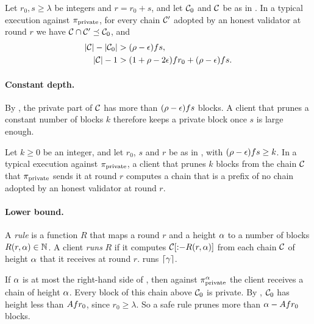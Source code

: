 \begin{lemma}\label{lem.attack}
    Let $r_0,s\ge\lambda$ be integers and $r=r_0+s$, and let $\mathcal{C}_0$ and $\mathcal{C}$
    be as in . In a typical execution against $\pi_{\mathrm{private}}$, for
    every chain $\mathcal{C}'$ adopted by an honest validator at round $r$ we have
    $\mathcal{C}\cap\mathcal{C}'\preceq\mathcal{C}_0$, and
    \begin{align}
        \lvert \mathcal{C}\rvert-\lvert \mathcal{C}_0\rvert &> (\rho-\epsilon)fs,
            \label{eq.attfork}\\
        \lvert \mathcal{C}\rvert-1 &> (1+\rho-2\epsilon)fr_0+(\rho-\epsilon)fs.
            \label{eq.attheight}
    \end{align}
\end{lemma}

\paragraph{Constant depth.}

By , the private part of $\mathcal{C}$ has more than
$(\rho-\epsilon)fs$ blocks. A client that prunes a constant number of
blocks $k$ therefore keeps a private block once $s$ is large enough.

\begin{corollary}\label{cor.constant}
    Let $k\ge0$ be an integer, and let $r_0$, $s$ and $r$ be as in
    , with $(\rho-\epsilon)fs\ge k$. In a typical execution
    against $\pi_{\mathrm{private}}$, a client that prunes $k$ blocks from the chain $\mathcal{C}$
    that $\pi_{\mathrm{private}}$ sends it at round $r$ computes a chain that is a prefix of
    no chain adopted by an honest validator at round $r$.
\end{corollary}

\paragraph{Lower bound.}

A \emph{rule} is a function $R$ that maps a round $r$ and a height $\alpha$ to a
number of blocks $R(r,\alpha)\in\mathbb{N}$. A client \emph{runs} $R$ if it
computes $\mathcal{C}[{:}{-}R(r,\alpha)]$ from each chain $\mathcal{C}$ of height $\alpha$ that it
receives at round $r$.  runs $\lceil\gamma\rceil$.

If $\alpha$ is at most the right-hand side of , then against
$\pi_{\mathrm{private}}^\alpha$ the client receives a chain of height $\alpha$. Every block of
this chain above $\mathcal{C}_0$ is private. By , $\mathcal{C}_0$ has height
less than $A fr_0$, since $r_0\ge\lambda$. So a safe rule prunes more than
$\alpha-A fr_0$ blocks.

